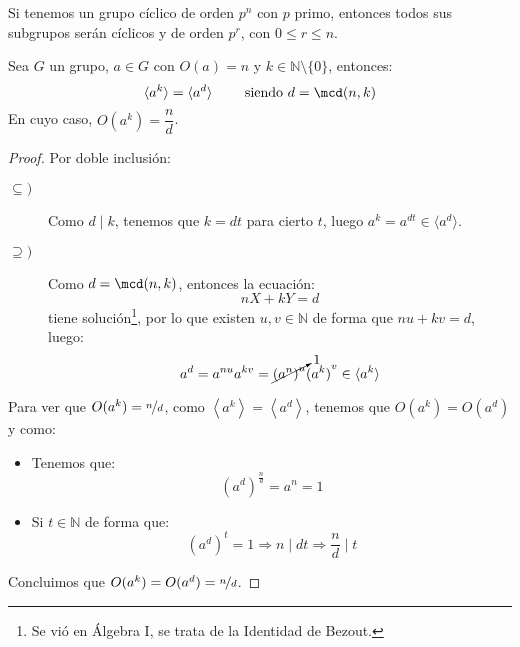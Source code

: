 \begin{coro}
    Si tenemos un grupo cíclico de orden $p^n$ con $p$ primo, entonces todos sus subgrupos serán cíclicos y de orden $p^r$, con $0\leq r\leq n$.
\end{coro}

\begin{prop}
    Sea $G$ un grupo, $a\in G$ con $O(a) = n$ y $k\in \mathbb{N}\setminus\{0\}$, entonces:
    \begin{equation*}
        \langle a^k \rangle  = \langle a^d \rangle \qquad \text{\ siendo\ } d = \mcd(n,k)
    \end{equation*}
    En cuyo caso, $O(a^k) = \dfrac{n}{d}$.
    \begin{proof}
        Por doble inclusión:
        \begin{description}
            \item [$\subseteq)$] Como $d\mid k$, tenemos que $k = dt$ para cierto $t$, luego $a^k = a^{dt}\in \langle a^d \rangle $.
            \item [$\supseteq)$] Como $d = \mcd(n,k)$, entonces la ecuación:
                \begin{equation*}
                    nX + kY = d
                \end{equation*}
                tiene solución\footnote{Se vió en Álgebra I, se trata de la Identidad de Bezout.}, por lo que existen $u,v\in \mathbb{N}$ de forma que $nu + kv = d$, luego:
                \begin{equation*}
                    a^d = a^{nu}a^{kv} = \cancelto{1}{{(a^n)}^{u}} {(a^{k})}^{v} \in \langle a^k \rangle 
                \end{equation*}
        \end{description}
        Para ver que $O(a^k) = \nicefrac{n}{d}$, como $\left\langle a^k \right\rangle = \left\langle a^d \right\rangle  $, tenemos que $O(a^k) = O(a^d)$ y como:
        \begin{itemize}
            \item Tenemos que:
                \begin{equation*}
                    {(a^d)}^{\frac{n}{d}} = a^n = 1
                \end{equation*}
            \item Si $t\in \mathbb{N}$ de forma que:
                \begin{equation*}
                    {(a^d)}^{t} = 1 \Longrightarrow n \mid dt \Longrightarrow \dfrac{n}{d}\mid t
                \end{equation*}
        \end{itemize}
        Concluimos que $O(a^k) = O(a^d)  = \nicefrac{n}{d} $.
    \end{proof}
\end{prop}

